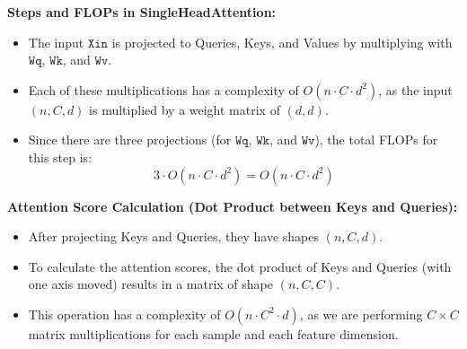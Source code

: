 \documentclass{article}
\begin{document}
\begin{tcolorbox}
\textbf{Steps and FLOPs in SingleHeadAttention:}
\begin{itemize}
    \item The input \(\texttt{Xin}\) is projected to Queries, Keys, and Values by multiplying with \(\texttt{Wq}\), \(\texttt{Wk}\), and \(\texttt{Wv}\).
    \item Each of these multiplications has a complexity of \(O(n \cdot C \cdot d^2)\), as the input \((n, C, d)\) is multiplied by a weight matrix of \((d, d)\).
    \item Since there are three projections (for \(\texttt{Wq}\), \(\texttt{Wk}\), and \(\texttt{Wv}\)), the total FLOPs for this step is:
    \[
    3 \cdot O(n \cdot C \cdot d^2) = O(n \cdot C \cdot d^2)
    \]
\end{itemize}

\textbf{Attention Score Calculation (Dot Product between Keys and Queries):}
\begin{itemize}
    \item After projecting Keys and Queries, they have shapes \((n, C, d)\).
    \item To calculate the attention scores, the dot product of Keys and Queries (with one axis moved) results in a matrix of shape \((n, C, C)\).
    \item This operation has a complexity of \(O(n \cdot C^2 \cdot d)\), as we are performing \(C \times C\) matrix multiplications for each sample and each feature dimension.
\end{itemize}

\end{tcolorbox}
\newpage
\end{document}
